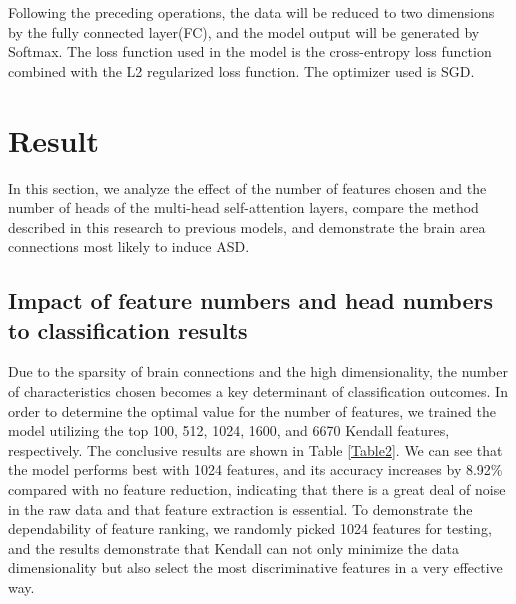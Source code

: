 \documentclass[a4paper]{cas-dc}
\begin{document}
Following the preceding operations, the data will be reduced to two dimensions by the fully connected layer(FC), and the model output will be generated by Softmax. The loss function used in the model is the cross-entropy loss function combined with the L2 regularized loss function. The optimizer used is SGD.
\section{Result}
In this section, we analyze the effect of the number of features chosen and the number of heads of the multi-head self-attention layers, compare the method described in this research to previous models, and demonstrate the brain area connections most likely to induce ASD.
\subsection{Impact of feature numbers and head numbers to classification results}
Due to the sparsity of brain connections and the high dimensionality, the number of characteristics chosen becomes a key determinant of classification outcomes. In order to determine the optimal value for the number of features, we trained the model utilizing the top 100, 512, 1024, 1600, and 6670 Kendall features, respectively. The conclusive results are shown in Table \ref{Table2}. We can see that the model performs best with 1024 features, and its accuracy increases by 8.92\% compared with no feature reduction, indicating that there is a great deal of noise in the raw data and that feature extraction is essential. To demonstrate the dependability of feature ranking, we randomly picked 1024 features for testing, and the results demonstrate that Kendall can not only minimize the data dimensionality but also select the most discriminative features in a very effective way.
\end{document}
